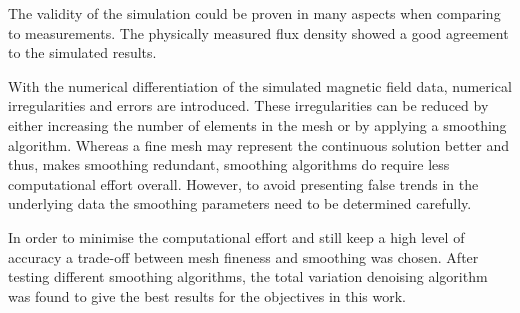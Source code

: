 The validity of the simulation could be proven in many aspects when comparing to measurements. The physically measured flux density showed a good agreement to the simulated results. 

With the numerical differentiation of the simulated magnetic field data, numerical irregularities and errors are introduced. These irregularities can be reduced by either increasing the number of elements in the mesh or by applying a smoothing algorithm. Whereas a fine mesh may represent the continuous solution better and thus, makes smoothing redundant, smoothing algorithms do require less computational effort overall. However, to avoid presenting false trends in the underlying data the smoothing parameters need to be determined carefully.

In order to minimise the computational effort and still keep a high level of accuracy a trade-off between mesh fineness and smoothing was chosen. After testing different smoothing algorithms, the total variation denoising algorithm was found to give the best results for the objectives in this work.


